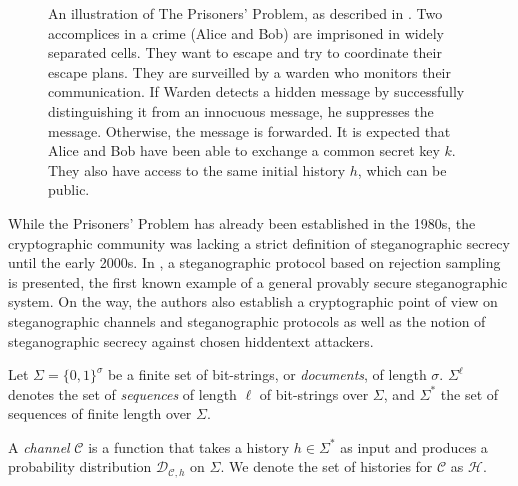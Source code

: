 \begin{figure}[htbp]
\centering
{}
\caption{
An illustration of The Prisoners' Problem, as described in \cite{Simmons1983}.
Two accomplices in a crime (Alice and Bob) are imprisoned in widely separated cells.
They want to escape and try to coordinate their escape plans.
They are surveilled by a warden who monitors their communication.
If Warden detects a hidden message by successfully distinguishing it from an innocuous message, he suppresses the message.
Otherwise, the message is forwarded.
It is expected that Alice and Bob have been able to exchange a common secret key $k$.
They also have access to the same initial history $h$, which can be public.
}
\label{fig:prisonersgame}
\end{figure}

While the Prisoners' Problem has already been established in the 1980s, the cryptographic community was lacking a strict definition of steganographic secrecy until the early 2000s.
In \cite{HLA2002}, a steganographic protocol based on rejection sampling is presented, the first known example of a general provably secure steganographic system.
On the way, the authors also establish a cryptographic point of view on steganographic channels and steganographic protocols as well as the notion of steganographic secrecy against chosen hiddentext attackers.

\begin{definition}
Let $\Sigma = \{0,1\}^\sigma$ be a finite set of bit-strings, or \emph{documents}, of length $\sigma$.
$\Sigma^\ell$ denotes the set of \emph{sequences} of length $\ell$ of bit-strings over $\Sigma$, and $\Sigma^*$ the set of sequences of finite length over $\Sigma$.

A \emph{channel} $\mathcal{C}$ is a function that takes a history $h \in \Sigma^*$ as input and produces a probability distribution $\mathcal{D}_{\mathcal{C},h}$ on $\Sigma$.
We denote the set of histories for $\mathcal{C}$ as $\mathcal{H}$.
\end{definition}


